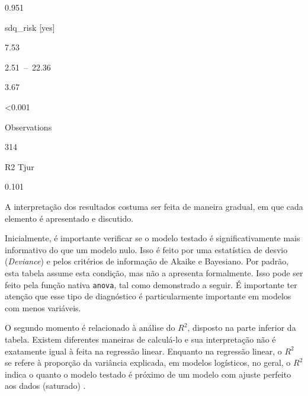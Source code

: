 \documentclass[
]{book}
\newenvironment{Shaded}{\begin{snugshade}}{\end{snugshade}}
\newcommand{\CommentTok}[1]{\textcolor[rgb]{0.56,0.35,0.01}{\textit{#1}}}
\newcommand{\DataTypeTok}[1]{\textcolor[rgb]{0.13,0.29,0.53}{#1}}
\newcommand{\DecValTok}[1]{\textcolor[rgb]{0.00,0.00,0.81}{#1}}
\newcommand{\KeywordTok}[1]{\textcolor[rgb]{0.13,0.29,0.53}{\textbf{#1}}}
\newcommand{\NormalTok}[1]{#1}
\newcommand{\OperatorTok}[1]{\textcolor[rgb]{0.81,0.36,0.00}{\textbf{#1}}}
\newcommand{\StringTok}[1]{\textcolor[rgb]{0.31,0.60,0.02}{#1}}
\begin{document}
0.951

sdq\_risk {[}yes{]}

7.53

2.51~--~22.36

3.67

\textless0.001

Observations

314

R2 Tjur

0.101

A interpretação dos resultados costuma ser feita de maneira gradual, em que cada elemento é apresentado e discutido.

Inicialmente, é importante verificar se o modelo testado é significativamente mais informativo do que um modelo nulo. Isso é feito por uma estatística de desvio (\emph{Deviance}) e pelos critérios de informação de Akaike e Bayesiano. Por padrão, esta tabela assume esta condição, mas não a apresenta formalmente. Isso pode ser feito pela função nativa \texttt{anova}, tal como demonstrado a seguir. É importante ter atenção que esse tipo de diagnóstico é particularmente importante em modelos com menos variáveis.

\begin{Shaded}
\end{Shaded}

O segundo momento é relacionado à análise do \(R^2\), disposto na parte inferior da tabela. Existem diferentes maneiras de calculá-lo e sua interpretação não é exatamente igual à feita na regressão linear. Enquanto na regressão linear, o \(R^2\) se refere à proporção da variância explicada, em modelos logísticos, no geral, o \(R^2\) indica o quanto o modelo testado é próximo de um modelo com ajuste perfeito aos dados (saturado) \citep{portugues2020}.
\end{document}
